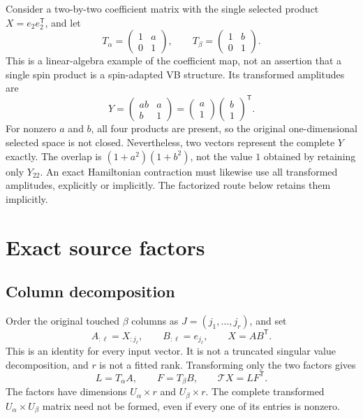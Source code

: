 \documentclass[11pt,a4paper]{article}
\newcommand{\Tr}{^{\mathsf T}}
\newcommand{\Ta}{\mathcal T}
\begin{document}
Consider a two-by-two coefficient matrix with the single selected product
$X=e_2e_2\Tr$, and let
\begin{equation}
 T_\alpha=\begin{pmatrix}1&a\\0&1\end{pmatrix},\qquad
 T_\beta=\begin{pmatrix}1&b\\0&1\end{pmatrix}.
\end{equation}
This is a linear-algebra example of the coefficient map, not an assertion
that a single spin product is a spin-adapted VB structure. Its transformed
amplitudes are
\begin{equation}\label{eq:example}
 Y=\begin{pmatrix}ab&a\\b&1\end{pmatrix}
 =\begin{pmatrix}a\\1\end{pmatrix}
  \begin{pmatrix}b\\1\end{pmatrix}\Tr.
\end{equation}
For nonzero $a$ and $b$, all four products are present, so the original
one-dimensional selected space is not closed. Nevertheless, two vectors
represent the complete $Y$ exactly. The overlap is
$(1+a^2)(1+b^2)$, not the value $1$ obtained by retaining only $Y_{22}$.
An exact Hamiltonian contraction must likewise use all transformed
amplitudes, explicitly or implicitly. The factorized route below retains
them implicitly.

\section{Exact source factors}

\subsection{Column decomposition}

Order the original touched $\beta$ columns as $J=(j_1,\ldots,j_r)$, and set
\begin{equation}\label{eq:source}
 A_{:\ell}=X_{:j_\ell},\qquad B_{:\ell}=e_{j_\ell},\qquad
 X=AB\Tr.
\end{equation}
This is an identity for every input vector. It is not a truncated singular
value decomposition, and $r$ is not a fitted rank. Transforming only the
two factors gives
\begin{equation}\label{eq:factors}
 L=T_\alpha A,\qquad F=T_\beta B,\qquad
 \Ta X=LF\Tr.
\end{equation}
The factors have dimensions $U_\alpha\times r$ and $U_\beta\times r$.
The complete transformed $U_\alpha\times U_\beta$ matrix need not be
formed, even if every one of its entries is nonzero.
\end{document}
